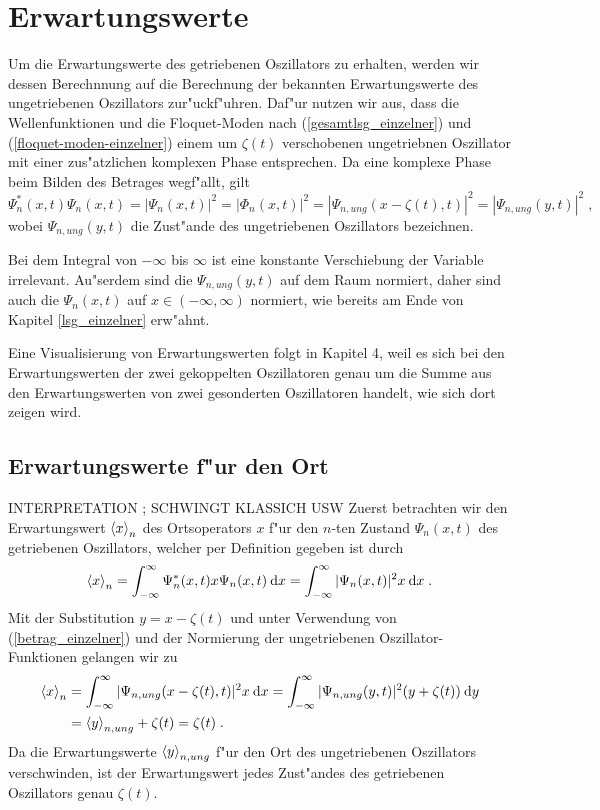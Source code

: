 \section{Erwartungswerte}
  Um die Erwartungswerte des getriebenen Oszillators zu erhalten, werden wir dessen Berechnnung auf die Berechnung der bekannten Erwartungswerte des ungetriebenen Oszillators zur"uckf"uhren.
  Daf"ur nutzen wir aus, dass die Wellenfunktionen und die Floquet-Moden nach (\ref{gesamtlsg_einzelner}) und (\ref{floquet-moden-einzelner}) einem um $\zeta(t)$ verschobenen ungetriebnen Oszillator mit einer zus"atzlichen komplexen Phase entsprechen.
  Da eine komplexe Phase beim Bilden des Betrages wegf"allt, gilt
  \begin{equation}
    \Psi_n^*(x,t)\Psi_n(x,t) = |\Psi_n(x,t)|^2 = |\Phi_n(x,t)|^2 = |\Psi_{n,ung}(x-\zeta(t),t)|^2 = |\Psi_{n,ung}(y,t)|^2 \; ,
    \label{betrag_einzelner}
  \end{equation}
  wobei $\Psi_{n,ung}(y,t)$ die Zust"ande des ungetriebenen Oszillators bezeichnen.

  Bei dem Integral von $-\infty$ bis $\infty$ ist eine konstante Verschiebung der Variable irrelevant.
  Au"serdem sind die $\Psi_{n,ung}(y,t)$ auf dem Raum normiert, daher sind auch die $\Psi_n(x,t)$ auf $x \in (-\infty,\infty)$ normiert, wie bereits am Ende von Kapitel \ref{lsg_einzelner} erw"ahnt.

  Eine Visualisierung von Erwartungswerten folgt in Kapitel 4, weil es sich bei den Erwartungswerten der zwei gekoppelten Oszillatoren genau um die Summe aus den Erwartungswerten von zwei gesonderten Oszillatoren handelt, wie sich dort zeigen wird.

  \subsection{Erwartungswerte f"ur den Ort}
  INTERPRETATION ; SCHWINGT KLASSICH USW
    Zuerst betrachten wir den Erwartungswert $\braket{x}_n$ des Ortsoperators $x$ f"ur den $n$-ten Zustand $\Psi_n(x,t)$ des getriebenen Oszillators, welcher per Definition gegeben ist durch
    \begin{equation}
      \braket{x}_n = \int_{-\infty}^{\infty} \Psi_n^*(x,t)x\Psi_n(x,t) \: \text dx
      = \int_{-\infty}^{\infty} |\Psi_n(x,t)|^2 x \: \text dx \; .
    \end{equation}
    Mit der Substitution $y=x-\zeta(t)$ und unter Verwendung von (\ref{betrag_einzelner}) und der Normierung der ungetriebenen Oszillator-Funktionen gelangen wir zu
    \begin{align}
      \begin{split}
        \braket{x}_n &= \int_{-\infty}^{\infty} |\Psi_{n,ung}(x-\zeta(t),t)|^2 x \: \text dx
        = \int_{-\infty}^{\infty} |\Psi_{n,ung}(y,t)|^2 (y+\zeta(t)) \: \text dy \\
        &= \braket{y}_{n,ung} + \zeta(t) = \zeta(t) \; .
      \end{split}
    \end{align}
    Da die Erwartungswerte $\braket{y}_{n,ung}$ f"ur den Ort des ungetriebenen Oszillators verschwinden, ist der Erwartungswert jedes Zust"andes des getriebenen Oszillators genau $\zeta(t)$.

